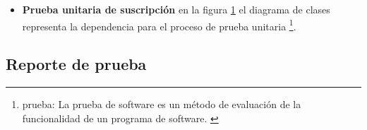 \begin{itemize}

\item \textbf{Prueba unitaria de suscripción} en la figura 
\ref{fig:Diagrama de clase representa la dependencia de suscripción}
el diagrama de clases representa la dependencia para el proceso de prueba
unitaria \footnote{prueba: La prueba de software es un método de evaluación
de la funcionalidad de un programa de software. \cite{test}}.

\begin{figure}[!ht]
	\centering
	\label{fig:Diagrama de clase representa la dependencia de suscripción}
\end{figure}

\end{itemize}

\subsection{Reporte de prueba}

